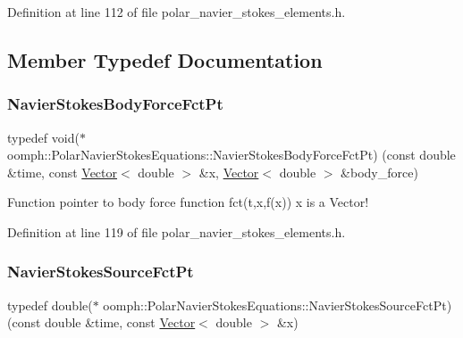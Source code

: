 Definition at line 112 of file polar\+\_\+navier\+\_\+stokes\+\_\+elements.\+h.



\subsection{Member Typedef Documentation}
\mbox{\label{classoomph_1_1PolarNavierStokesEquations_adfe008551ad8039abe5c9bf23af8c0e3}} 
\subsubsection{\texorpdfstring{Navier\+Stokes\+Body\+Force\+Fct\+Pt}{NavierStokesBodyForceFctPt}}
{\footnotesize\ttfamily typedef void($\ast$ oomph\+::\+Polar\+Navier\+Stokes\+Equations\+::\+Navier\+Stokes\+Body\+Force\+Fct\+Pt) (const double \&time, const \hyperlink{classoomph_1_1Vector}{Vector}$<$ double $>$ \&x, \hyperlink{classoomph_1_1Vector}{Vector}$<$ double $>$ \&body\+\_\+force)}



Function pointer to body force function fct(t,x,f(x)) x is a Vector! 



Definition at line 119 of file polar\+\_\+navier\+\_\+stokes\+\_\+elements.\+h.

\mbox{\label{classoomph_1_1PolarNavierStokesEquations_a9084ecf962b26ccaa72443a807dedb25}} 
\subsubsection{\texorpdfstring{Navier\+Stokes\+Source\+Fct\+Pt}{NavierStokesSourceFctPt}}
{\footnotesize\ttfamily typedef double($\ast$ oomph\+::\+Polar\+Navier\+Stokes\+Equations\+::\+Navier\+Stokes\+Source\+Fct\+Pt) (const double \&time, const \hyperlink{classoomph_1_1Vector}{Vector}$<$ double $>$ \&x)}



